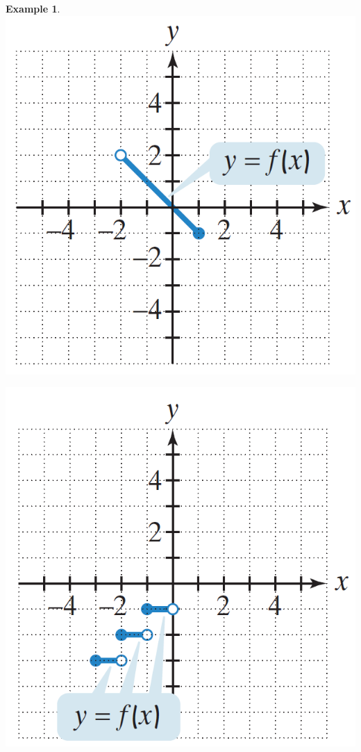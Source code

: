 \documentclass[addpoints,12pt]{exam}
\theoremstyle{definition}
\newtheorem{example}{Example}[subsection]
\begin{document}
\begin{example}
\begin{minipage}{.5\textwidth}
\includegraphics[scale=.4]{images/dom_rang_03}
\end{minipage}%
\begin{minipage}{.5\textwidth}
\includegraphics[scale=.4]{images/dom_rang_04}
\end{minipage}%
\vspace{1in}

\end{example}
\end{document}

